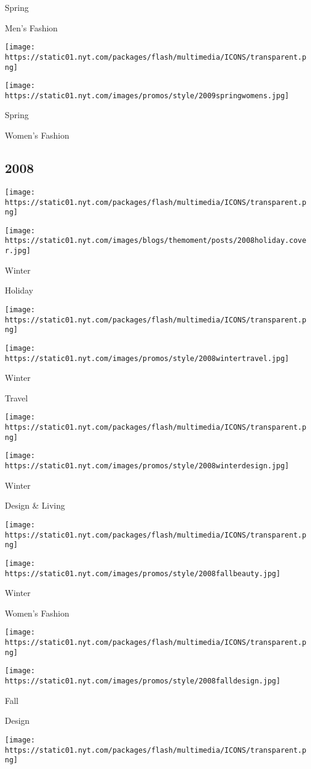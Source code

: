 Spring

Men's Fashion

\texttt{[image: https://static01.nyt.com/packages/flash/multimedia/ICONS/transparent.png]}

\texttt{[image: https://static01.nyt.com/images/promos/style/2009springwomens.jpg]}

Spring

Women's Fashion

\hypertarget{2008}{%
\subsection{2008}\label{2008}}

\texttt{[image: https://static01.nyt.com/packages/flash/multimedia/ICONS/transparent.png]}

\texttt{[image: https://static01.nyt.com/images/blogs/themoment/posts/2008holiday.cover.jpg]}

Winter

Holiday

\texttt{[image: https://static01.nyt.com/packages/flash/multimedia/ICONS/transparent.png]}

\texttt{[image: https://static01.nyt.com/images/promos/style/2008wintertravel.jpg]}

Winter

Travel

\texttt{[image: https://static01.nyt.com/packages/flash/multimedia/ICONS/transparent.png]}

\texttt{[image: https://static01.nyt.com/images/promos/style/2008winterdesign.jpg]}

Winter

Design \& Living

\texttt{[image: https://static01.nyt.com/packages/flash/multimedia/ICONS/transparent.png]}

\texttt{[image: https://static01.nyt.com/images/promos/style/2008fallbeauty.jpg]}

Winter

Women's Fashion

\texttt{[image: https://static01.nyt.com/packages/flash/multimedia/ICONS/transparent.png]}

\texttt{[image: https://static01.nyt.com/images/promos/style/2008falldesign.jpg]}

Fall

Design

\texttt{[image: https://static01.nyt.com/packages/flash/multimedia/ICONS/transparent.png]}

